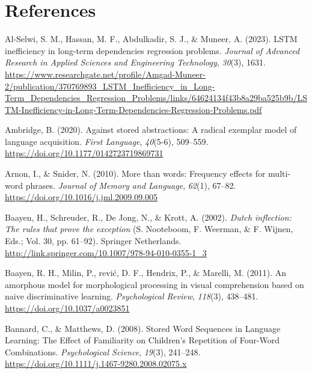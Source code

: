 \documentclass[
  12pt,
  letterpaper,
]{scrreprt}
\newlength{\cslhangindent}
\newenvironment{CSLReferences}[2] %
 {\begin{list}{}{%
  \setlength{\itemindent}{0pt}
  \setlength{\leftmargin}{0pt}
  \setlength{\parsep}{0pt}
  \ifodd #1
   \setlength{\leftmargin}{\cslhangindent}
   \setlength{\itemindent}{-1\cslhangindent}
  \fi
  \setlength{\itemsep}{#2\baselineskip}}}
 {\end{list}}
\begin{document}

\chapter*{References}\label{references}


\begingroup
\raggedright

\label{refs}
\begin{CSLReferences}{1}{0}
Al-Selwi, S. M., Hassan, M. F., Abdulkadir, S. J., \& Muneer, A. (2023).
LSTM inefficiency in long-term dependencies regression problems.
\emph{Journal of Advanced Research in Applied Sciences and Engineering
Technology}, \emph{30}(3), 1631.
\url{https://www.researchgate.net/profile/Amgad-Muneer-2/publication/370769893_LSTM_Inefficiency_in_Long-Term_Dependencies_Regression_Problems/links/64624134f43b8a29ba525b9b/LSTM-Inefficiency-in-Long-Term-Dependencies-Regression-Problems.pdf}

Ambridge, B. (2020). Against stored abstractions: A radical exemplar
model of language acquisition. \emph{First Language}, \emph{40}(5-6),
509--559. \url{https://doi.org/10.1177/0142723719869731}

Arnon, I., \& Snider, N. (2010). More than words: Frequency effects for
multi-word phrases. \emph{Journal of Memory and Language}, \emph{62}(1),
67--82. \url{https://doi.org/10.1016/j.jml.2009.09.005}

Baayen, H., Schreuder, R., De Jong, N., \& Krott, A. (2002). \emph{Dutch
inflection: The rules that prove the exception} (S. Nooteboom, F.
Weerman, \& F. Wijnen, Eds.; Vol. 30, pp. 61--92). Springer Netherlands.
\url{http://link.springer.com/10.1007/978-94-010-0355-1_3}

Baayen, R. H., Milin, P., rević, D. F., Hendrix, P., \& Marelli, M.
(2011). An amorphous model for morphological processing in visual
comprehension based on naive discriminative learning.
\emph{Psychological Review}, \emph{118}(3), 438--481.
\url{https://doi.org/10.1037/a0023851}

Bannard, C., \& Matthews, D. (2008). Stored Word Sequences in Language
Learning: The Effect of Familiarity on Children's Repetition of
Four-Word Combinations. \emph{Psychological Science}, \emph{19}(3),
241--248. \url{https://doi.org/10.1111/j.1467-9280.2008.02075.x}


\end{CSLReferences}
\end{document}
